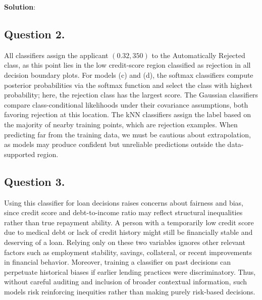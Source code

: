 \documentclass[submit]{../harvardml}
\newenvironment{solution}{
    \vspace{2mm}
    \color{blue}\noindent\textbf{Solution}:
}{}
\begin{document}
\begin{solution}
\subsection{Question 2.}

All classifiers assign the applicant $(0.32, 350)$ to the Automatically Rejected class, as this point lies in the low credit-score region classified as rejection in all decision boundary plots. For models (c) and (d), the softmax classifiers compute posterior probabilities via the softmax function and select the class with highest probability; here, the rejection class has the largest score. The Gaussian classifiers compare class-conditional likelihoods under their covariance assumptions, both favoring rejection at this location. The kNN classifiers assign the label based on the majority of nearby training points, which are rejection examples. When predicting far from the training data, we must be cautious about extrapolation, as models may produce confident but unreliable predictions outside the data-supported region.

\subsection{Question 3.}

Using this classifier for loan decisions raises concerns about fairness and bias, since credit score and debt-to-income ratio may reflect structural inequalities rather than true repayment ability. A person with a temporarily low credit score due to medical debt or lack of credit history might still be financially stable and deserving of a loan. Relying only on these two variables ignores other relevant factors such as employment stability, savings, collateral, or recent improvements in financial behavior. Moreover, training a classifier on past decisions can perpetuate historical biases if earlier lending practices were discriminatory. Thus, without careful auditing and inclusion of broader contextual information, such models risk reinforcing inequities rather than making purely risk-based decisions.

\end{solution}

\newpage
\end{document}
